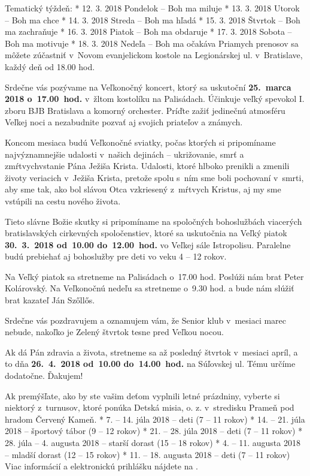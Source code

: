 Tematický týždeň:
\begitems
* 12. 3. 2018	Pondelok	–   Boh ma miluje
* 13. 3. 2018	Utorok	–   Boh ma chce
* 14. 3. 2018	Streda	–   Boh ma hľadá
* 15. 3. 2018	Štvrtok	–   Boh ma zachraňuje
* 16. 3. 2018	Piatok	–   Boh ma obdaruje
* 17. 3. 2018	Sobota	–   Boh ma motivuje
* 18. 3. 2018	Nedeľa	–   Boh ma očakáva
\enditems
Priamych prenosov sa môžete zúčastniť v~Novom evanjelickom kostole na Legionárskej ul. v~Bratislave, každý deň od 18.00 hod.


Srdečne vás pozývame na Veľkonočný koncert, ktorý sa uskutoční {\bf 25.~marca 2018 o~17.00~hod.} v~žltom kostolíku na Palisádach. Účinkuje veľký spevokol I. zboru BJB Bratislava a komorný orchester. Príďte zažiť jedinečnú atmosféru Veľkej noci a nezabudnite pozvať aj svojich priateľov a známych.


Koncom mesiaca budú Veľkonočné sviatky, počas ktorých si pripomíname najvýznamnejšie udalosti v~našich dejinách – ukrižovanie, smrť a zmŕtvychvstanie Pána Ježiša Krista. Udalosti, ktoré hlboko prenikli a zmenili životy veriacich v~Ježiša Krista, pretože spolu s~ním sme boli pochovaní v~smrti, aby sme tak, ako bol slávou Otca vzkriesený z~mŕtvych Kristus, aj my sme vstúpili na cestu nového života.

Tieto slávne Božie skutky si pripomíname na spoločných bohoslužbách viacerých bratislavských cirkevných spoločenstiev, ktoré sa uskutočnia na Veľký piatok {\bf 30.~3.~2018 od~10.00 do~12.00~hod.} vo Veľkej sále Istropolisu. Paralelne budú prebiehať aj bohoslužby pre deti vo veku 4 -- 12 rokov.


Na Veľký piatok sa stretneme na Palisádach o~17.00 hod. Poslúži nám brat Peter Kolárovský. Na Veľkonočnú nedeľu sa stretneme o~9.30 hod. a bude nám slúžiť brat kazateľ Ján Szőllős.


Srdečne vás pozdravujem a oznamujem vám, že Senior klub v~mesiaci marec nebude, nakoľko je Zelený štvrtok tesne pred Veľkou nocou.

Ak dá Pán zdravia a života, stretneme sa až posledný štvrtok v~mesiaci apríl, a to dňa {\bf 26.~4.~2018 od~10.00 do~14.00~hod.} na Súľovskej ul. Tému určíme dodatočne. Ďakujem!



Ak premýšľate, ako by ste vašim deťom vyplnili letné prázdniny, vyberte si niektorý z~turnusov, ktoré ponúka Detská misia, o. z. v~stredisku Prameň pod hradom Červený Kameň.
\begitems
* 7. -- 14. júla 2018 – deti (7 -- 11 rokov)
* 14. -- 21. júla 2018 – športový tábor (9 -- 12 rokov)
* 21. -- 28. júla 2018 – deti (7 -- 11 rokov)
* 28. júla -- 4. augusta 2018 – starší dorast (15 -- 18 rokov)
* 4. -- 11. augusta 2018 – mladší dorast (12 -- 15 rokov)
* 11. -- 18. augusta 2018 – deti (7 -- 11 rokov)
\enditems
Viac informácií a elektronickú prihlášku nájdete na .


